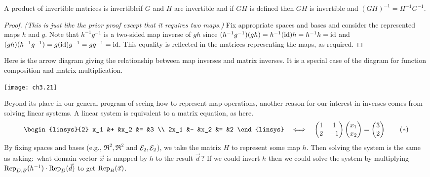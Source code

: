 \begin{lemma} \label{lem:ProdInvIsInv}
A product of invertible matrices is invertible\Dash if
\( G \) and \( H \) are invertible and if \( GH \) is defined then
\( GH \) is invertible and \( (GH)^{-1}=H^{-1}G^{-1} \).
\end{lemma}

\begin{proof}
\textit{(This is just like the prior proof except that it requires two maps.)}
Fix appropriate spaces and bases and consider the represented maps \( h \) and
\( g \).
Note that \( h^{-1}g^{-1} \) is a two-sided map inverse of \( gh \) since
\(
  (h^{-1}g^{-1})(gh)
  =
  h^{-1}(\identity)h
  =h^{-1}h
  =\identity
\)
and
\(
  (gh)(h^{-1}g^{-1})
  =
  g(\identity)g^{-1}
  =gg^{-1}
  =\identity
\).
This equality is reflected in the matrices representing the maps, as
required.
\end{proof}

Here is the arrow diagram giving the relationship
between map inverses and matrix inverses. 
It is a special case
of the diagram for function composition and matrix multiplication.
\smallskip
\begin{center}
    \texttt{[image: ch3.21]}
\end{center}

Beyond its place in our general program of 
seeing how to represent map operations, 
another reason for our interest in inverses comes from solving
linear systems.
A linear system is equivalent to a matrix equation, as here.
\begin{equation*}
  \begin{linsys}{2}
    x_1  &+  &x_2  &=  &3  \\
   2x_1  &-  &x_2  &=  &2  
  \end{linsys}
  \quad\Longleftrightarrow\quad
  \begin{pmatrix}
       1  &1  \\
       2  &-1
    \end{pmatrix}
  \colvec{x_1 \\ x_2}
  =
  \colvec{3 \\ 2}
\tag*{($*$)}\end{equation*}
By fixing spaces and bases (e.g., $\Re^2,\Re^2$ and $\stdbasis_2,\stdbasis_2$),
we take the matrix $H$ to represent some map $h$.
Then solving the system is the same as 
asking:~what domain vector $\vec{x}$ is mapped by $h$ to the result 
$\vec{d}\,$?
If we could invert $h$ then we could solve the system  
by multiplying $\rep{h^{-1}}{D,B}\cdot\rep{\vec{d}}{D}$
to get $\rep{\vec{x}}{B}$.

